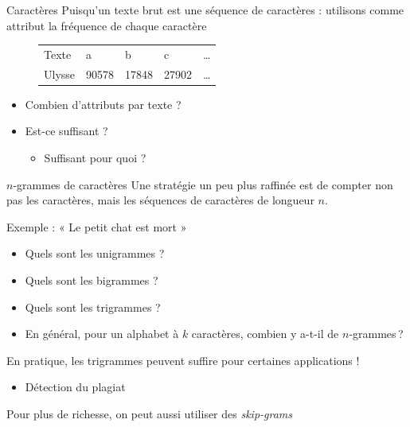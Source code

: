 \documentclass[hyperref={unicode}, xcolor={svgnames}, french]{beamer}
\begin{document}
\begin{frame}[fragile=singleslide]{Caractères}
    Puisqu'un texte brut est une séquence de caractères : utilisons comme attribut la fréquence de chaque caractère

    \begin{figure}
        \begin{tabu}{*{5}{>{\ttfamily\small}X[m, c]}}
            Texte   & a & b & c & …\\
            Ulysse  & 90578 & 17848 & 27902 & …
        \end{tabu}
    \end{figure}

    \begin{itemize}
        \item Combien d'attributs par texte ?
        \item Est-ce suffisant ?
            \begin{itemize}
                \item Suffisant pour quoi ?
            \end{itemize}
    \end{itemize}
\end{frame}

\begin{frame}{$n$-grammes de caractères}
    Une stratégie un peu plus raffinée est de compter non pas les caractères, mais les séquences de caractères de longueur $n$.

    Exemple : « Le petit chat est mort »

    \begin{itemize}
        \item Quels sont les unigrammes ?
        \item Quels sont les bigrammes ?
        \item Quels sont les trigrammes ?
        \item En général, pour un alphabet à $k$ caractères, combien y a-t-il de $n$-grammes ?
    \end{itemize}

    En pratique, les trigrammes peuvent suffire pour certaines applications !
    \begin{itemize}
        \item Détection du plagiat
    \end{itemize}

    Pour plus de richesse, on peut aussi utiliser des \emph{skip-grams}
\end{frame}
\end{document}
